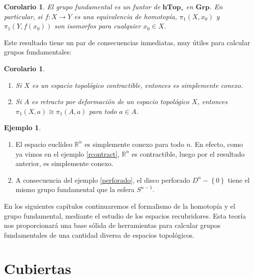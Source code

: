 \documentclass[12pt,a4paper]{book}
\newtheorem{corol}[thm]{Corolario}
\theoremstyle{definition} \newtheorem{defn}[thm]{Definición}
\theoremstyle{definition} \newtheorem{ejemplo}[thm]{Ejemplo}
\theoremstyle{definition} \newtheorem{ejercicio}[thm]{Ejercicio}
\theoremstyle{remark} \newtheorem*{obs}{Observación}
\def\RR{\mathbb{R}}
\def\gf{\pi_1}
\def\htop{\mathbf{hTop}}
\def\grp{\mathbf{Grp}}
\begin{document}
\begin{corol}
  El grupo fundamental es un funtor de $\htop_*$ en $\grp$. En particular, si $f:X\rightarrow Y$  es una equivalencia de homotopía, $\gf(X,x_0)$ y $\gf(Y,f(x_0))$ son isomorfos para cualquier $x_0 \in X$.
\end{corol}
Este resultado tiene un par de consecuencias inmediatas, muy útiles para calcular grupos fundamentales:
\begin{corol}\leavevmode
\begin{enumerate}
  \item Si $X$ es un espacio topológico contractible, entonces es simplemente conexo.
  \item Si $A$ es retracto por deformación de un espacio topológico $X$, entonces $\gf(X,a)\cong\gf(A,a)$ para todo $a\in A$.
\end{enumerate}
\end{corol}

\begin{ejemplo}\leavevmode
  \begin{enumerate}
    \item El espacio euclídeo $\RR^n$ es simplemente conexo para todo $n$. En efecto, como ya vimos en el ejemplo \ref{rcontract}, $\RR^n$ es contractible, luego por el resultado anterior, es simplemente conexo.
    \item A consecuencia del ejemplo \ref{perforado}, el disco perforado $D^n-\left\{ 0 \right\}$ tiene el mismo grupo fundamental que la esfera $S^{n-1}$.
  \end{enumerate}
\end{ejemplo}

En los siguientes capítulos continuaremos el formalismo de la homotopía y el grupo fundamental, mediante el estudio de los espacios recubridores. Esta teoría nos proporcionará una base sólida de herramientas para calcular grupos fundamentales de una cantidad diversa de espacios topológicos.

\chapter{Cubiertas}
\end{document}
